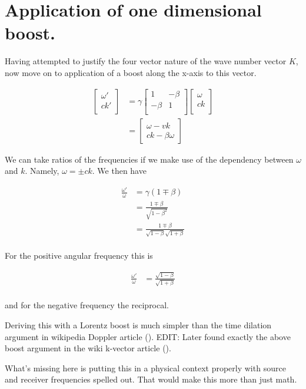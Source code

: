 \section{Application of one dimensional boost.}

Having attempted to justify the four vector nature of the wave number vector $K$, now move on to application of a boost along the x-axis to this vector.

\begin{align*}
\begin{bmatrix}
\omega' \\
c k' \\
\end{bmatrix}
&=
\gamma
\begin{bmatrix}
1 & -\beta \\
-\beta& 1 \\
\end{bmatrix}
\begin{bmatrix}
\omega \\
c k \\
\end{bmatrix} 
\\
&=
\begin{bmatrix}
\omega - v k \\
c k - \beta \omega
\end{bmatrix} 
\end{align*}

We can take ratios of the frequencies if we make use of the dependency between $\omega$ and $k$.  Namely, $\omega = \pm c k$.  We then have

\begin{align*}
\frac{\omega'}{\omega}
&= \gamma(1 \mp \beta) \\
&= \frac{1 \mp \beta}{\sqrt{1 - \beta^2}} \\
&= \frac{1 \mp \beta}{\sqrt{1 - \beta}\sqrt{1 + \beta}} \\
\end{align*}

For the positive angular frequency this is

\begin{align*}
\frac{\omega'}{\omega}
&= \frac{\sqrt{1 - \beta}}{\sqrt{1 + \beta}} 
\\
\end{align*}

and for the negative frequency the reciprocal.

Deriving this with a Lorentz boost is much simpler than the time dilation argument in wikipedia Doppler article (\citep{wiki:relDoppler}).  EDIT: Later found exactly the above boost argument in the wiki k-vector article (\citep{wiki:kvector}).

What's missing here is putting this in a physical context properly with source and receiver frequencies spelled out.  That would make this more than just math.

\EndArticle
